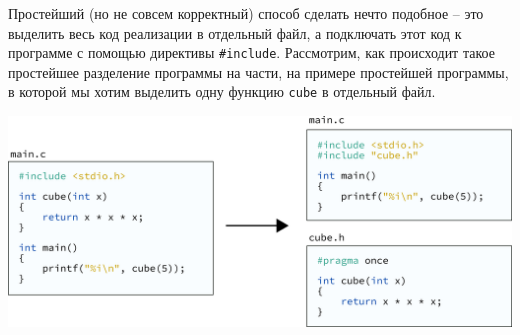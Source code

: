 \documentclass[10pt]{article}
\begin{document}
Простейший (но не совсем корректный) способ сделать нечто подобное -- это выделить весь код реализации в отдельный файл, а подключать этот код к программе с помощью директивы \texttt{\#include}. Рассмотрим, как происходит такое простейшее разделение программы на части, на примере простейшей программы, в которой мы хотим выделить одну функцию \texttt{cube} в отдельный файл. 

\begin{center}
\includegraphics[scale=0.9]{../images/main_cube_include.png}
\end{center}
\end{document}
